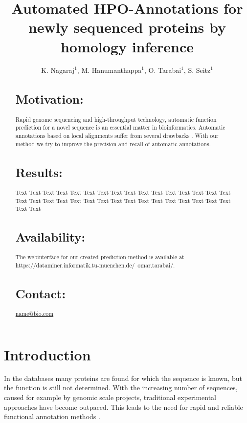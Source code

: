 \documentclass{bioinfo}
\begin{document}

\title[HPO Annotator]{Automated HPO-Annotations for newly sequenced proteins by homology inference}
\author{K. Nagaraj$^{1}$, M. Hanumanthappa$^{1}$, O. Tarabai$^{1}$, S. Seitz$^{1}$}
\address{$^{1}$Fakul\"at f\"ur Informatik, Boltzmannstr. 3, 85748 Garching}



\maketitle

\begin{abstract}

\section{Motivation:}
Rapid genome sequencing and high-throughput technology, automatic function prediction for a novel sequence is an essential matter in bioinformatics. Automatic annotations based on local alignments suffer from several drawbacks \citep{Ori06}. With our method we try to improve the precision and recall of automatic annotations.
\section{Results:}
Text  Text Text Text Text Text Text Text Text Text  Text Text Text Text Text Text Text Text Text  Text Text Text Text Text Text Text Text Text  Text Text Text Text Text Text

\section{Availability:}
The webinterface for our created prediction-method is available at https://dataminer.informatik.tu-muenchen.de/~omar.tarabai/.

\section{Contact:} \href{name@bio.com}{name@bio.com}
\end{abstract}

\section{Introduction}
In the databases many proteins are found for which the sequence is known, but the function is still not determined. With the increasing number of sequences, caused for example by genomic scale projects, traditional experimental approaches have become outpaced. This leads to the need for rapid and reliable functional annotation methods \citep{Rodrigues07}. 
\end{document}
